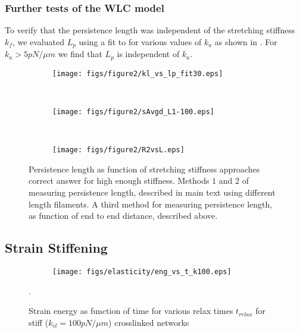 \documentclass[12pt]{article}
\begin{document}
\subsubsection{Further tests of the WLC model}
To verify that the persistence length was independent of the stretching stiffness $k_f$, we evaluated $L_p$ using a fit
to  for various values of $k_a$ as shown in . For $k_a>5pN/\mu m$ we find
that $L_p$ is independent of $k_a$. 
\begin{figure}[H]
  \begin{subfigure}{0.4\textwidth}
    \centering
    \texttt{[image: figs/figure2/kl\_vs\_lp\_fit30.eps]}
    \caption{\label{fig:kl}}
  \end{subfigure}%
  ~
  \begin{subfigure}{0.6\textwidth}
    \centering
    \texttt{[image: figs/figure2/sAvgd\_L1-100.eps]}
    \caption{\label{fig:lp_vs_l}}
  \end{subfigure}
  ~
  \begin{subfigure}{0.4\textwidth}
    \centering
    \texttt{[image: figs/figure2/R2vsL.eps]}
    \caption{\label{fig:R2}}
  \end{subfigure}
  \label{fig:wlc_supp}
  \caption{
    Persistence length as function of stretching stiffness approaches correct answer for high
  enough stiffness. 
  Methods $1$ and $2$ of measuring persistence length, described in main text using different length
  filaments.
   A third method for measuring persistence length, as function of end to end distance, described above.
}
\end{figure}
\subsection{Strain Stiffening} \label{strain_supp} 
\begin{figure}[H] 
  \begin{subfigure}{0.35\textwidth}
    \centering
    \texttt{[image: figs/elasticity/eng\_vs\_t\_k100.eps]}
    \caption{\label{fig:tRelax100}}
  \end{subfigure}
  \label{fig:tRelax}
  \caption{ Strain energy as function of time for various relax times $t_{relax}$ for stiff ($k_{cl}=100pN/\mu m$)
crosslinked networks}.
\end{figure}
\end{document}
